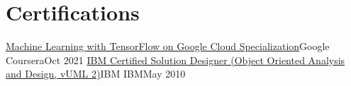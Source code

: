\section{Certifications}
  \resumeSubHeadingListStart
    \resumeSubheading
      {\href{https://www.coursera.org/account/accomplishments/specialization/certificate/JJTMLY8U43XB}{Machine Learning with TensorFlow on Google Cloud Specialization}}{Google}
      {Coursera}{Oct 2021} 
    \resumeSubheading
      {\href{https://drive.google.com/file/d/1xZD_WC_LG5fD0N0FLdJ-ipE5J9z_ZXgH/view?usp=sharing}{IBM Certified Solution Designer (Object Oriented Analysis and Design, vUML 2)}}{IBM}
      {IBM}{May 2010}

  \resumeSubHeadingListEnd